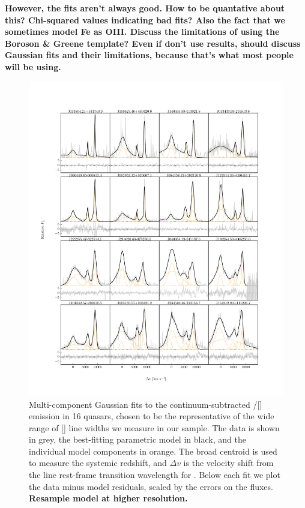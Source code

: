 {\bf However, the fits aren't always good. How to be quantative about this? Chi-squared values indicating bad fits? Also the fact that we sometimes model Fe as OIII. Discuss the limitations of using the Boroson \& Greene template? Even if don't use results, should discuss Gaussian fits and their limitations, because that's what most people will be using.}

\begin{figure}
    \includegraphics[width=\textwidth]{figures/chapter04/example_spectrum_grid.pdf} 
    \caption{Multi-component Gaussian fits to the continuum-subtracted \hbns/[] emission in 16 quasars, chosen to be the representative of the wide range of [] line widths we measure in our sample. The data is shown in grey, the best-fitting parametric model in black, and the individual model components in orange. The broad \hb centroid is used to measure the systemic redshift, and $\Delta{v}$ is the velocity shift from the line rest-frame transition wavelength for \hbns. Below each fit we plot the data minus model residuals, scaled by the errors on the fluxes. {\bf Resample model at higher resolution.}}     
    \label{fig:example_spectrum_grid}
\end{figure}

